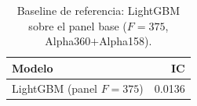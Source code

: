 \begin{table}[htbp]
\caption{Baseline de referencia: LightGBM sobre el panel base ($F\!=\!375$, Alpha360$+$Alpha158).}
\label{tab:ablation}
\centering
\begin{tabular}{lr}
\toprule
Modelo & IC \\
\midrule
LightGBM (panel $F\!=\!375$) & 0.0136 \\
\bottomrule
\end{tabular}
\end{table}

